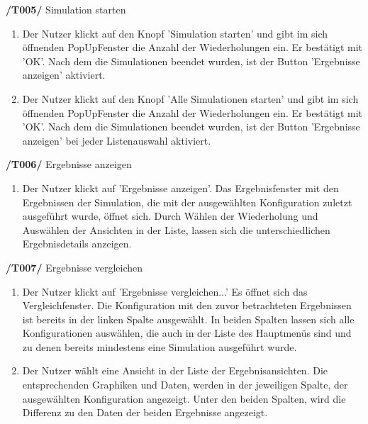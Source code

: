\textbf{/T005/} Simulation starten
\begin{enumerate}
\item {}
{Der Nutzer klickt auf den Knopf 'Simulation starten' und gibt im sich öffnenden PopUpFenster die Anzahl der Wiederholungen ein. Er bestätigt mit 'OK'.}
{Nach dem die Simulationen beendet wurden, ist der Button 'Ergebnisse anzeigen' aktiviert.}

\item {}
{Der Nutzer klickt auf den Knopf 'Alle Simulationen starten' und gibt im sich öffnenden PopUpFenster die Anzahl der Wiederholungen ein. Er bestätigt mit 'OK'.}
{Nach dem die Simulationen beendet wurden, ist der Button 'Ergebnisse anzeigen' bei jeder Listenauswahl aktiviert.}


\end{enumerate}

\textbf{/T006/} Ergebnisse anzeigen
\begin{enumerate}
\item {}
{Der Nutzer klickt auf 'Ergebnisse anzeigen'.}
{Das Ergebnisfenster mit den Ergebnissen der Simulation, die mit der ausgewählten Konfiguration zuletzt ausgeführt wurde, öffnet sich. Durch Wählen der Wiederholung und Auswählen der Ansichten in der Liste, lassen sich die unterschiedlichen Ergebnisdetails anzeigen.}


\end{enumerate}

\textbf{/T007/} Ergebnisse vergleichen
\begin{enumerate}
\item {}
{Der Nutzer klickt auf 'Ergebnisse vergleichen...'}
{Es öffnet sich das Vergleichfenster. Die Konfiguration mit den zuvor betrachteten Ergebnissen ist bereits in der linken Spalte ausgewählt. In beiden Spalten lassen sich alle Konfigurationen auswählen, die auch in der Liste des Hauptmenüs sind und zu denen bereits mindestens eine Simulation ausgeführt wurde.}

\item {}
{Der Nutzer wählt eine Ansicht in der Liste der Ergebnisansichten.}
{Die entsprechenden Graphiken und Daten, werden in der jeweiligen Spalte, der ausgewählten Konfiguration angezeigt. Unter den beiden Spalten, wird die Differenz zu den Daten der beiden Ergebnisse angezeigt.}


\end{enumerate}


